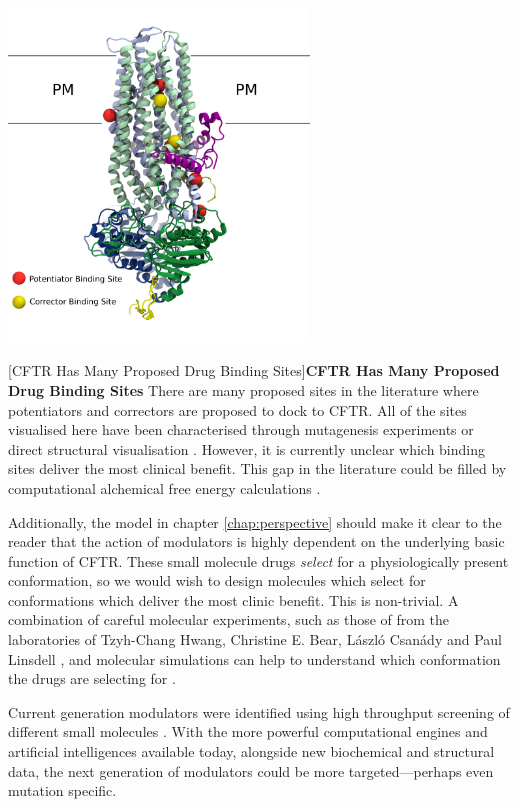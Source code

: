 \begin{center}
	\includegraphics[width=0.6\textwidth]{figures/many_drug_sites.pdf}
\end{center}
\begingroup
\captionsetup{singlelinecheck = false, justification=raggedright}
[CFTR Has Many Proposed Drug Binding Sites]{\textbf{CFTR Has Many Proposed Drug Binding Sites} {There are many proposed sites in the literature where potentiators and correctors are proposed to dock to CFTR. All of the sites visualised here have been characterised through mutagenesis experiments or direct structural visualisation \cite{yeh2019, laselva2021a, liu2019, baatallah2021}. However, it is currently unclear which binding sites deliver the most clinical benefit. This gap in the literature could be filled by computational alchemical free energy calculations \cite{jorgensen2008,chipot2007}. }}
\label{many_drug_bound_CFTR}
\endgroup


Additionally, the model in chapter \ref{chap:perspective} should make it clear to the reader that the action of modulators is highly dependent on the underlying basic function of CFTR. These small molecule drugs \textit{select} for a physiologically present conformation, so we would wish to design molecules which select for conformations which deliver the most clinic benefit. This is non-trivial. A combination of careful molecular experiments, such as those of from the laboratories of Tzyh-Chang Hwang,  Christine E. Bear, L\'aszl\'o Csan\'ady and Paul Linsdell \cite{linsdell2018, csanady2019, laselva2022, zhang2017b}, and molecular simulations can help to understand which conformation the drugs are selecting for \cite{laselva2021a}.

Current generation modulators were identified using high throughput screening of different small molecules \cite{vangoor2009}. With the more powerful computational engines and artificial intelligences available today, alongside new biochemical and structural data, the next generation of modulators could be more targeted---perhaps even mutation specific.

